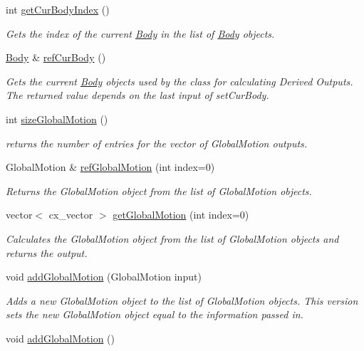 \begin{DoxyCompactItemize}
int \hyperlink{class_outputs_body_a7331d48ef7cee6bd23ac0ab487894d6c}{get\-Cur\-Body\-Index} ()
\begin{DoxyCompactList}\small\item\em Gets the index of the current \hyperlink{class_body}{Body} in the list of \hyperlink{class_body}{Body} objects. \end{DoxyCompactList}\item 
\hyperlink{class_body}{Body} \& \hyperlink{class_outputs_body_afdb3f49b84baf1a6b2de8a5d014abfe5}{ref\-Cur\-Body} ()
\begin{DoxyCompactList}\small\item\em Gets the current \hyperlink{class_body}{Body} objects used by the class for calculating Derived Outputs. The returned value depends on the last input of set\-Cur\-Body. \end{DoxyCompactList}\item 
int \hyperlink{class_outputs_body_acf20f3cfb2baee6c93a2e17d7e27aa0c}{size\-Global\-Motion} ()
\begin{DoxyCompactList}\small\item\em returns the number of entries for the vector of Global\-Motion outputs. \end{DoxyCompactList}\item 
Global\-Motion \& \hyperlink{class_outputs_body_a54325e076109111454b5ed0633c85660}{ref\-Global\-Motion} (int index=0)
\begin{DoxyCompactList}\small\item\em Returns the Global\-Motion object from the list of Global\-Motion objects. \end{DoxyCompactList}\item 
vector$<$ cx\-\_\-vector $>$ \hyperlink{class_outputs_body_a7450d306af9db6bb159a1186f017ce6e}{get\-Global\-Motion} (int index=0)
\begin{DoxyCompactList}\small\item\em Calculates the Global\-Motion object from the list of Global\-Motion objects and returns the output. \end{DoxyCompactList}\item 
void \hyperlink{class_outputs_body_a29af17e822ec8fe1a397403752d0ff1a}{add\-Global\-Motion} (Global\-Motion input)
\begin{DoxyCompactList}\small\item\em Adds a new Global\-Motion object to the list of Global\-Motion objects. This version sets the new Global\-Motion object equal to the information passed in. \end{DoxyCompactList}\item 
\hypertarget{class_outputs_body_a889dcf6d9be6e910c110018e0a309eae}{void \hyperlink{class_outputs_body_a889dcf6d9be6e910c110018e0a309eae}{add\-Global\-Motion} ()}\label{class_outputs_body_a889dcf6d9be6e910c110018e0a309eae}


\end{DoxyCompactItemize}
